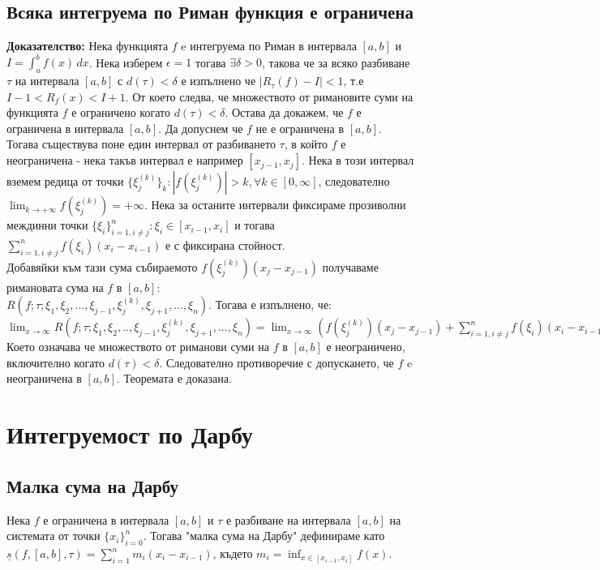 \documentclass[fleqn,12pt]{article}
\begin{document}
\begin{flushleft}
\subsection{Всяка интегруема по Риман функция е ограничена}
\textbf{Доказателство: } Нека функцията $f$ e интегруема по Риман в интервала $[a,b]$ и $I = \int_{a}^{b}  f(x)\,dx$. Нека изберем $\epsilon=1$ тогава $\exists \delta>0$, такова че 
за всяко разбиване $\tau$ на интервала $[a,b]$ с $d(\tau)<\delta$ е изпълнено че $|R_\tau(f) - I|<1$, т.е $I-1<R_f(x)<I+1$. От което следва, че множеството от римановите суми на функцията
$f$ е ограничено когато $d(\tau)<\delta$. Остава да докажем, че $f$ е ограничена в интервала $[a,b]$.
Да допуснем че $f$ не е ограничена в $[a,b]$. Тогава съществува поне един интервал от разбиването $\tau$, в който $f$ е неограничена - нека такъв интервал е например $[x_{j-1},x_j]$.
Нека в този интервал вземем редица от точки $\{\xi_j^{(k)}\}_k : |f(\xi_j^{(k)})| > k, \forall k \in [0,\infty]$, следователно $\lim_{k \rightarrow +\infty} f(\xi_j^{(k)}) = +\infty$.
Нека за останите интервали фиксираме прозиволни междинни точки $\{\xi_i\}_{i=1,i \neq j}^n : \xi_i \in [x_{i-1},x_i]$ и тогава $\sum_{i=1,i \neq j}^{n} f(\xi_i)(x_i - x_{i-1})$ е с фиксирана стойност.\\
Добавяйки към тази сума събираемото $f(\xi_j^{(k)})(x_j - x_{j-1})$ получаваме римановата сума на $f$ в $[a,b]$:\\
$R(f;\tau;\xi_1,\xi_2, ... ,\xi_{j-1},\xi_j^{(k)},\xi_{j+1}, ... ,\xi_n)$. Тогава е изпълнено, че:\\
$\lim_{x \rightarrow \infty} R(f;\tau;\xi_1,\xi_2, .. ,\xi_{j-1},\xi_j^{(k)},\xi_{j+1}, ... ,\xi_n) = \lim_{x \rightarrow \infty} (f(\xi_j^{(k)})(x_j - x_{j-1}) + \sum_{i=1,i \neq j}^{n} f(\xi_i)(x_i - x_{i-1})) = +\infty$ \\
Което означава че множеството от риманови суми на $f$ в $[a,b]$ е неограничено, включително когато $d(\tau)<\delta$. Следователно противоречие с допускането, че $f$ e неограничена в $[a,b]$.
Теоремата е доказана. 

\section{Интегруемост по Дарбу}
\subsection{Малка сума на Дарбу}
Нека $f$ е ограничена в интервала $[a,b]$ и $\tau$ е разбиване на интервала $[a,b]$ на системата от точки $\{x_i\}_{i=0}^{n}$.
Тогава "малка сума на Дарбу" дефинираме като $\underline{s}(f,[a,b],\tau)=\sum_{i=1}^{n} m_i(x_i-x_{i-1})$, където $m_i=\inf_{x\in[x_{i-1},x_i]}f(x)$.


\end{flushleft}
\end{document}
